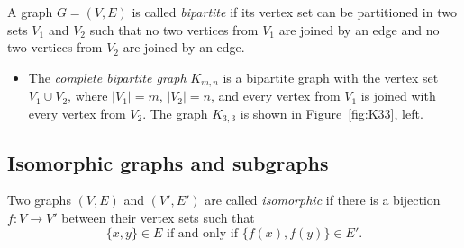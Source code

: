 \begin{page}
\setcounter{section}{1}
\setcounter{subsection}{2}
\setcounter{dfn}{2}
\label{portion:147}

\begin{dfn}
A graph $G = (V, E)$ is called \emph{bipartite} if its vertex set can be partitioned in two sets $V_1$ and $V_2$ such that
no two vertices from $V_1$ are joined by an edge and no two vertices from $V_2$ are joined by an edge.
\end{dfn}

\end{page}

\begin{page}
\setcounter{section}{1}
\setcounter{subsection}{3}
\setcounter{dfn}{2}
\label{portion:148}


\begin{itemize}
\item
The \emph{complete bipartite graph} $K_{m,n}$ is a bipartite graph with the vertex set $V_1 \cup V_2$,
where $|V_1| = m$, $|V_2| = n$, and every vertex from $V_1$ is joined with every vertex from $V_2$.
The graph $K_{3,3}$ is shown in Figure~\ref{fig:K33}, left.
\end{itemize}



\end{page}

\begin{page}
\setcounter{section}{1}
\setcounter{subsection}{3}
\setcounter{dfn}{2}
\label{portion:149}

\subsection{Isomorphic graphs and subgraphs}
\label{sec:Subgraphs}

\end{page}

\begin{page}
\setcounter{section}{1}
\setcounter{subsection}{3}
\setcounter{dfn}{3}
\label{portion:151}

\begin{dfn}
Two graphs $(V, E)$ and $(V', E')$ are called \emph{isomorphic} if there is a bijection $f \colon V \to V'$
between their vertex sets such that
\[
\{x, y\} \in E \text{ if and only if } \{f(x), f(y)\} \in E'.
\]
\end{dfn}

\end{page}

